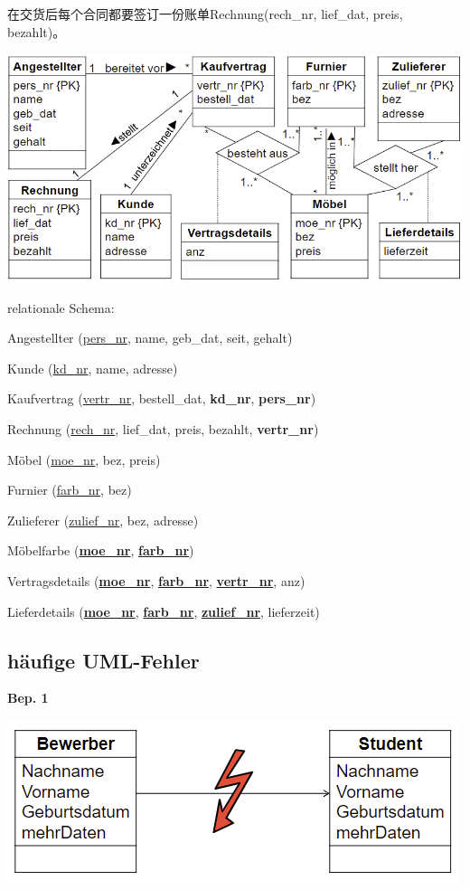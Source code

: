 \documentclass[fleqn]{article}
\begin{document}
在交货后每个合同都要签订一份账单Rechnung(rech\_nr, lief\_dat, preis, bezahlt)。

\begin{center} 
    \includegraphics[scale=0.5]{18.png}
\end{center}

\noindent relationale Schema:

Angestellter (\underline{pers\_nr}, name, geb\_dat, seit, gehalt)

Kunde (\underline{kd\_nr}, name, adresse)

Kaufvertrag (\underline{vertr\_nr}, bestell\_dat, \textbf{kd\_nr}, \textbf{pers\_nr})

Rechnung (\underline{rech\_nr}, lief\_dat, preis, bezahlt, \textbf{vertr\_nr})

Möbel (\underline{moe\_nr}, bez, preis)

Furnier (\underline{farb\_nr}, bez)

Zulieferer (\underline{zulief\_nr}, bez, adresse)

Möbelfarbe (\underline{\textbf{moe\_nr}}, \underline{\textbf{farb\_nr}})

Vertragsdetails (\underline{\textbf{moe\_nr}}, \underline{\textbf{farb\_nr}}, \underline{\textbf{vertr\_nr}}, anz)

Lieferdetails (\underline{\textbf{moe\_nr}}, \underline{\textbf{farb\_nr}}, \underline{\textbf{zulief\_nr}}, lieferzeit)

\subsection{häufige UML-Fehler}

\noindent\textbf{Bep. 1}

\begin{center} 
    \includegraphics[scale=0.5]{8.png}
\end{center}
\end{document}
